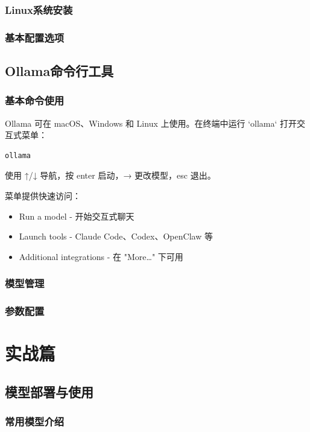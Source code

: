 \documentclass[12pt,UTF8]{ctexbook}
\begin{document}
\section{Linux系统安装}
\section{基本配置选项}

\chapter{Ollama命令行工具}
\section{基本命令使用}

Ollama 可在 macOS、Windows 和 Linux 上使用。在终端中运行 `ollama` 打开交互式菜单：

\begin{verbatim}
ollama
\end{verbatim}

使用 ↑/↓ 导航，按 enter 启动，→ 更改模型，esc 退出。

菜单提供快速访问：

\begin{itemize}
  \item Run a model - 开始交互式聊天
  \item Launch tools - Claude Code、Codex、OpenClaw 等
  \item Additional integrations - 在 "More…" 下可用
\end{itemize}

\section{模型管理}
\section{参数配置}

\part{实战篇}
\chapter{模型部署与使用}
\section{常用模型介绍}
\end{document}
